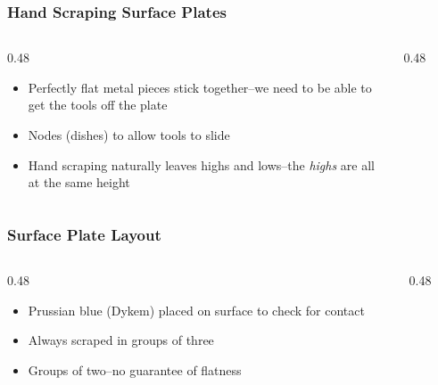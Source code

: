 \begin{frame}
	\frametitle{Hand Scraping Surface Plates}

    \begin{columns}
        \begin{column}{0.48\linewidth}
            \begin{itemize}[<+- | alert@+>]
                \item Perfectly flat metal pieces stick together--we need to be able to get the tools off the plate 
                \item Nodes (dishes) to allow tools to slide
                \item Hand scraping naturally leaves highs and lows--the \emph{highs} are all at the same height
            \end{itemize}
        \end{column}
        \begin{column}{0.48\linewidth}
            \begin{figure}
                \centering
                \resizebox{\linewidth}{!}{
                    
                }
            \end{figure}
        \end{column}
    \end{columns}
\end{frame}

\begin{frame}
	\frametitle{Surface Plate Layout}

    \begin{columns}
        \begin{column}{0.48\linewidth}
            \begin{itemize}[<+- | alert@+>]
                \item Prussian blue (Dykem) placed on surface to check for contact
                \item Always scraped in groups of three
                \item Groups of two--no guarantee of flatness
            \end{itemize}
        \end{column}
        \begin{column}{0.48\linewidth}
        \end{column}
    \end{columns}

    
\end{frame}

